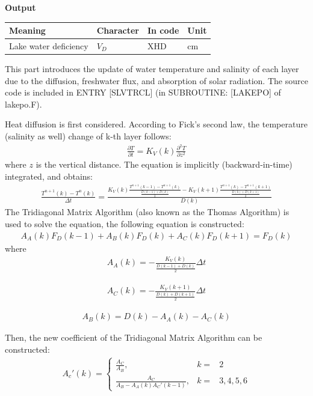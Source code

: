\textbf{Output}

\begin{longtable}[]{@{}llll@{}}
\toprule\noalign{}
Meaning & Character & In code & Unit \\
\midrule\noalign{}
\endhead
\bottomrule\noalign{}
\endlastfoot
Lake water deficiency & \(V_{D}\) & XHD & cm \\
\end{longtable}

This part introduces the update of water temperature and salinity of each layer due to the diffusion, freshwater flux, and absorption of solar radiation. The source code is included in ENTRY
{[}SLVTRCL{]} (in SUBROUTINE: {[}LAKEPO{]} of lakepo.F).

Heat diffusion is first considered. According to Fick's second law, the temperature (salinity as well) change of k-th layer follows: \begin{eqnarray}
\frac{\partial T}{\partial t}=K_{V}(k)\frac{\partial^2 T}{\partial z^2}
\end{eqnarray} where \(z\) is the vertical distance. The equation is implicitly (backward-in-time) integrated, and obtains: \begin{eqnarray}
\frac{T^{n+1}(k)-T^{n}(k)}{\Delta t}=\frac{K_{V}(k)\frac{T^{n+1}(k-1)-T^{n+1}(k)}{\frac{D(k-1)+D(k)}{2}}-K_{V}(k+1)\frac{T^{n+1}(k)-T^{n+1}(k+1)}{\frac{D(k)+D(k+1)}{2}}}{D(k)}
\end{eqnarray} The Tridiagonal Matrix Algorithm (also known as the Thomas Algorithm) is used to solve the equation, the following equation is constructed: \begin{eqnarray}
A_{A}(k)F_{D}(k-1)+A_{B}(k)F_{D}(k)+A_{C}(k)F_{D}(k+1)=F_{D}(k)
\end{eqnarray} where \begin{eqnarray}
A_{A}(k)=-\frac{K_{V}(k)}{\frac{D(k-1)+D(k)}{2}}\Delta t
\end{eqnarray}

\begin{eqnarray}
A_{C}(k)=-\frac{K_{V}(k+1)}{\frac{D(k)+D(k+1)}{2}}\Delta t
\end{eqnarray}

\begin{eqnarray}
A_{B}(k)=D(k)-A_{A}(k)-A_{C}(k)
\end{eqnarray}

Then, the new coefficient of the Tridiagonal Matrix Algorithm can be constructed: \begin{eqnarray}
A_{c}'(k)=\left\{\begin{matrix}
\frac{A_{C}}{A_{B}},&k=&2\\\frac{A_{C}}{A_{B}-A_{A}(k)A_{C}'(k-1)}, &k=&3, 4, 5, 6
\end{matrix}\right.
\end{eqnarray}

